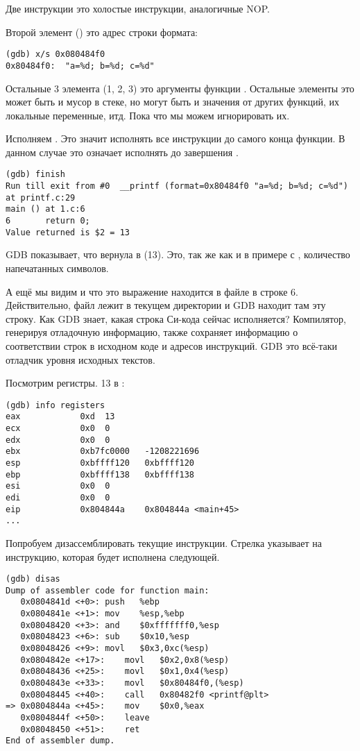 Две инструкции  это холостые инструкции, аналогичные \ac{NOP}.

Второй элемент () это адрес строки формата:

\begin{lstlisting}
(gdb) x/s 0x080484f0
0x80484f0:	"a=%d; b=%d; c=%d"
\end{lstlisting}

Остальные 3 элемента (1, 2, 3) это аргументы функции \printf.
Остальные элементы это может быть и мусор в стеке, но могут быть и значения
от других функций, их локальные переменные, итд.
Пока что мы можем игнорировать их.

Исполняем . 
Это значит исполнять все инструкции до самого конца функции. 
В данном случае это означает исполнять до завершения \printf.

\begin{lstlisting}
(gdb) finish
Run till exit from #0  __printf (format=0x80484f0 "a=%d; b=%d; c=%d") at printf.c:29
main () at 1.c:6
6		return 0;
Value returned is $2 = 13
\end{lstlisting}

\ac{GDB} показывает, что вернула \printf в \EAX (13).
Это, так же как и в примере с \olly, количество напечатанных символов.

А ещё мы видим  и что это выражение находится в файле  в строке 6.
Действительно, файл  лежит в текущем директории и \ac{GDB} находит там эту строку.
Как \ac{GDB} знает, какая строка Си-кода сейчас исполняется?
Компилятор, генерируя отладочную информацию, также сохраняет информацию о соответствии строк в исходном коде и адресов инструкций.
GDB это всё-таки отладчик уровня исходных текстов.

Посмотрим регистры.
13 в \EAX:

\begin{lstlisting}
(gdb) info registers
eax            0xd	13
ecx            0x0	0
edx            0x0	0
ebx            0xb7fc0000	-1208221696
esp            0xbffff120	0xbffff120
ebp            0xbffff138	0xbffff138
esi            0x0	0
edi            0x0	0
eip            0x804844a	0x804844a <main+45>
...
\end{lstlisting}

Попробуем дизассемблировать текущие инструкции.
Стрелка указывает на инструкцию, которая будет исполнена следующей.

\begin{lstlisting}[style=customasmx86]
(gdb) disas
Dump of assembler code for function main:
   0x0804841d <+0>:	push   %ebp
   0x0804841e <+1>:	mov    %esp,%ebp
   0x08048420 <+3>:	and    $0xfffffff0,%esp
   0x08048423 <+6>:	sub    $0x10,%esp
   0x08048426 <+9>:	movl   $0x3,0xc(%esp)
   0x0804842e <+17>:	movl   $0x2,0x8(%esp)
   0x08048436 <+25>:	movl   $0x1,0x4(%esp)
   0x0804843e <+33>:	movl   $0x80484f0,(%esp)
   0x08048445 <+40>:	call   0x80482f0 <printf@plt>
=> 0x0804844a <+45>:	mov    $0x0,%eax
   0x0804844f <+50>:	leave  
   0x08048450 <+51>:	ret    
End of assembler dump.
\end{lstlisting}


